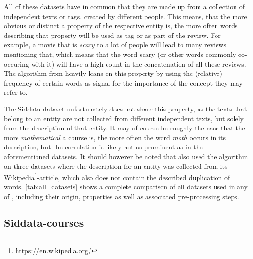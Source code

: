 All of these datasets have in common that they are made up from a collection of independent texts or tags, created by different people. This means, that the more obvious or distinct a property of the respective entity is, the more often words describing that property will be used as tag or as part of the review. For example, a movie that is \emph{scary} to a lot of people will lead to many reviews mentioning that, which means that the word scary (or other words commonly co-occuring with it) will have a high count in the concatenation of all these reviews. The algorithm from \cite{Derrac2015} heavily leans on this property by using the (relative) frequency of certain words as signal for the importance of the concept they may refer to. 

The Siddata-dataset unfortunately does not share this property, as the texts that belong to an entity are not collected from different independent texts, but solely from the description of that entity. It may of course be roughly the case that the more \emph{mathematical} a course is, the more often the word \emph{math} occurs in its description, but the correlation is likely not as prominent as in the aforementioned datasets. It should however be noted that \cite{Alshaikh2020} also used the algorithm on three datasets where the description for an entity was collected from its Wikipedia\footnote{\url{https://en.wikipedia.org/}}-article, which also does not contain the described duplication of words. \autoref{tab:all_datasets} shows a complete comparison of all datasets used in any of \mainalgos, including their origin, properties as well as associated pre-processing steps.



\subsection{Siddata-courses}

\label{sec:dataset_siddata}


